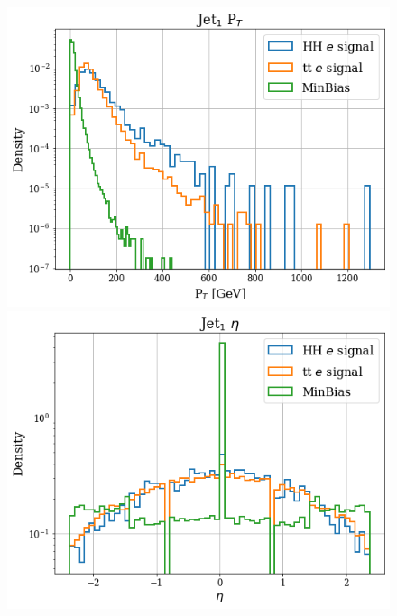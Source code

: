 \documentclass[../main.tex]{subfiles}
\begin{document}
 \begin{figure}[!ht]
  \begin{minipage}[b]{0.33\linewidth}
    \centering
    \includegraphics[width=1\linewidth]{Chapters/Plots/Hist_1ele_jet1_Et.png}
  \end{minipage}%
  \begin{minipage}[b]{0.33\linewidth}
    \centering
    \includegraphics[width=1\linewidth]{Chapters/Plots/Hist_1ele_jet1_Eta.png}
  \end{minipage} %
  \begin{minipage}[b]{0.33\linewidth}

\end{minipage}
\end{figure}
\end{document}
